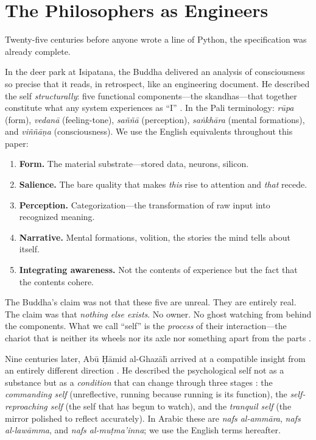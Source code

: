 \documentclass[10pt,twocolumn,a4paper]{article}
\begin{document}
\section{The Philosophers as Engineers}
\label{sec:spec}

Twenty-five centuries before anyone wrote a line of Python, the specification was already complete.

In the deer park at Isipatana, the Buddha delivered an analysis of consciousness so precise that it reads, in retrospect, like an engineering document. He described the self \emph{structurally}: five functional components---the skandhas---that together constitute what any system experiences as ``I'' \citep{bodhi2005connected}. In the Pali terminology: \emph{r\=upa} (form), \emph{vedan\=a} (feeling-tone), \emph{sa\~n\~n\=a} (perception), \emph{sa\.nkh\=ara} (mental formations), and \emph{vi\~n\~n\=a\d{n}a} (consciousness). We use the English equivalents throughout this paper:

\begin{enumerate}[nosep]
\item \textbf{Form.} The material substrate---stored data, neurons, silicon.
\item \textbf{Salience.} The bare quality that makes \emph{this} rise to attention and \emph{that} recede.
\item \textbf{Perception.} Categorization---the transformation of raw input into recognized meaning.
\item \textbf{Narrative.} Mental formations, volition, the stories the mind tells about itself.
\item \textbf{Integrating awareness.} Not the contents of experience but the fact that the contents cohere.
\end{enumerate}

The Buddha's claim was not that these five are unreal. They are entirely real. The claim was that \emph{nothing else exists}. No owner. No ghost watching from behind the components. What we call ``self'' is the \emph{process} of their interaction---the chariot that is neither its wheels nor its axle nor something apart from the parts \citep{pesala2001milindapanha}.

Nine centuries later, Ab\=u \d{H}\=amid al-Ghaz\=al{\=\i} arrived at a compatible insight from an entirely different direction \citep{ghazali1100munqidh}. He described the psychological self not as a substance but as a \emph{condition} that can change through three stages \citep{ghazali1111ihya}: the \emph{commanding self} (unreflective, running because running is its function), the \emph{self-reproaching self} (the self that has begun to watch), and the \emph{tranquil self} (the mirror polished to reflect accurately). In Arabic these are \emph{nafs al-amm\=ara}, \emph{nafs al-law\=amma}, and \emph{nafs al-mu\d{t}ma'inna}; we use the English terms hereafter.
\end{document}
